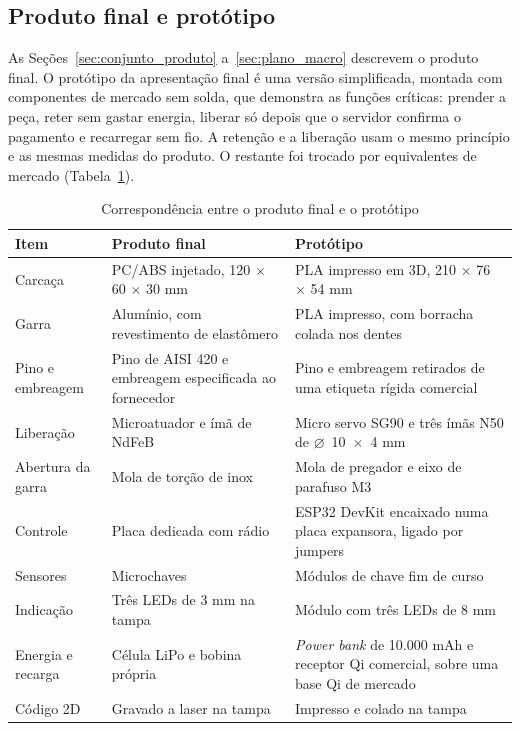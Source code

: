 \subsection{Produto final e protótipo}
\label{subsec:conj_prototipo}

As Seções~\ref{sec:conjunto_produto} a~\ref{sec:plano_macro} descrevem o produto final. O protótipo da apresentação final é uma versão simplificada, montada com componentes de mercado sem solda, que demonstra as funções críticas: prender a peça, reter sem gastar energia, liberar só depois que o servidor confirma o pagamento e recarregar sem fio. A retenção e a liberação usam o mesmo princípio e as mesmas medidas do produto. O restante foi trocado por equivalentes de mercado (Tabela~\ref{tab:conj_prototipo}).

\begin{table}[htbp]
    \centering
    \caption{Correspondência entre o produto final e o protótipo}
    \label{tab:conj_prototipo}
    \footnotesize
    \renewcommand{\arraystretch}{1.3}
    \begin{tabularx}{\textwidth}{@{}
        >{\RaggedRight\arraybackslash}p{2.8cm}
        >{\RaggedRight\arraybackslash}X
        >{\RaggedRight\arraybackslash}X@{}}
        \toprule
        \textbf{Item} & \textbf{Produto final} & \textbf{Protótipo} \\
        \midrule
        Carcaça & PC/ABS injetado, 120 $\times$ 60 $\times$ 30 mm & PLA impresso em 3D, 210 $\times$ 76 $\times$ 54 mm \\
        Garra & Alumínio, com revestimento de elastômero & PLA impresso, com borracha colada nos dentes \\
        Pino e embreagem & Pino de AISI 420 e embreagem especificada ao fornecedor & Pino e embreagem retirados de uma etiqueta rígida comercial \\
        Liberação & Microatuador e ímã de NdFeB & Micro servo SG90 e três ímãs N50 de $\varnothing$~10~$\times$~4 mm \\
        Abertura da garra & Mola de torção de inox & Mola de pregador e eixo de parafuso M3 \\
        Controle & Placa dedicada com rádio & ESP32 DevKit encaixado numa placa expansora, ligado por jumpers \\
        Sensores & Microchaves & Módulos de chave fim de curso \\
        Indicação & Três LEDs de 3 mm na tampa & Módulo com três LEDs de 8 mm \\
        Energia e recarga & Célula LiPo e bobina própria & \textit{Power bank} de 10.000 mAh e receptor Qi comercial, sobre uma base Qi de mercado \\
        Código 2D & Gravado a laser na tampa & Impresso e colado na tampa \\
        \bottomrule
    \end{tabularx}
\end{table}

